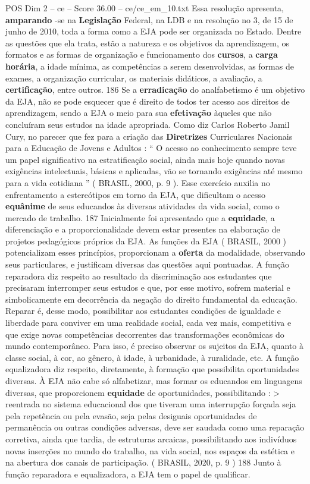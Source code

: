 \begin{textsample}{POS Dim 2 – ce – Score 36.00 – ce/ce\_em\_10.txt}
Essa resolução apresenta, \textbf{amparando} -se na \textbf{Legislação} Federal, na LDB e na resolução no 3, de 15 de junho de 2010, toda a forma como a EJA pode ser organizada no Estado.
Dentre as questões que ela trata, estão a natureza e os objetivos da aprendizagem, os formatos e as formas de organização e funcionamento dos \textbf{cursos}, a \textbf{carga} \textbf{horária}, a idade mínima, as competências a serem desenvolvidas, as formas de exames, a organização curricular, os materiais didáticos, a avaliação, a \textbf{certificação}, entre outros. 186 Se a \textbf{erradicação} do analfabetismo é um objetivo da EJA, não se pode esquecer que é direito de todos ter acesso aos direitos de aprendizagem, sendo a EJA o meio para sua \textbf{efetivação} àqueles que não concluíram seus estudos na idade apropriada.
Como diz Carlos Roberto Jamil Cury, no parecer que fez para a criação das \textbf{Diretrizes} Curriculares Nacionais para a Educação de Jovens e Adultos : “ O acesso ao conhecimento sempre teve um papel significativo na estratificação social, ainda mais hoje quando novas exigências intelectuais, básicas e aplicadas, vão se tornando exigências até mesmo para a vida cotidiana ” ( BRASIL, 2000, p. 9 ).
Esse exercício auxilia no enfrentamento a estereótipos em torno da EJA, que dificultam o acesso \textbf{equânime} de seus educandos às diversas atividades da vida social, como o mercado de trabalho. 187 Inicialmente foi apresentado que a \textbf{equidade}, a diferenciação e a proporcionalidade devem estar presentes na elaboração de projetos pedagógicos próprios da EJA.
As funções da EJA ( BRASIL, 2000 ) potencializam esses princípios, proporcionam a \textbf{oferta} da modalidade, observando seus particulares, e justificam diversas das questões aqui pontuadas.
A função reparadora diz respeito ao resultado da discriminação aos estudantes que precisaram interromper seus estudos e que, por esse motivo, sofrem material e simbolicamente em decorrência da negação do direito fundamental da educação.
Reparar é, desse modo, possibilitar aos estudantes condições de igualdade e liberdade para conviver em uma realidade social, cada vez mais, competitiva e que exige novas competências decorrentes das transformações econômicas do mundo contemporâneo.
Para isso, é preciso observar os sujeitos da EJA, quanto à classe social, à cor, ao gênero, à idade, à urbanidade, à ruralidade, etc.
A função equalizadora diz respeito, diretamente, à formação que possibilita oportunidades diversas.
À EJA não cabe só alfabetizar, mas formar os educandos em linguagens diversas, que proporcionem \textbf{equidade} de oportunidades, possibilitando : > reentrada no sistema educacional dos que tiveram uma interrupção forçada seja pela repetência ou pela evasão, seja pelas desiguais oportunidades de permanência ou outras condições adversas, deve ser saudada como uma reparação corretiva, ainda que tardia, de estruturas arcaicas, possibilitando aos indivíduos novas inserções no mundo do trabalho, na vida social, nos espaços da estética e na abertura dos canais de participação. ( BRASIL, 2020, p. 9 ) 188 Junto à função reparadora e equalizadora, a EJA tem o papel de qualificar.

\end{textsample}
